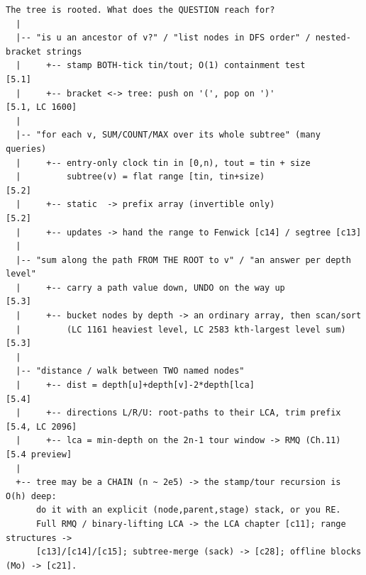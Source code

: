 \begin{lstlisting}[language={}, basicstyle=\ttfamily\small, numbers=none, frame=single]
  The tree is rooted. What does the QUESTION reach for?
  |
  |-- "is u an ancestor of v?" / "list nodes in DFS order" / nested-bracket strings
  |     +-- stamp BOTH-tick tin/tout; O(1) containment test            [5.1]
  |     +-- bracket <-> tree: push on '(', pop on ')'                  [5.1, LC 1600]
  |
  |-- "for each v, SUM/COUNT/MAX over its whole subtree" (many queries)
  |     +-- entry-only clock tin in [0,n), tout = tin + size
  |         subtree(v) = flat range [tin, tin+size)                    [5.2]
  |     +-- static  -> prefix array (invertible only)                  [5.2]
  |     +-- updates -> hand the range to Fenwick [c14] / segtree [c13]
  |
  |-- "sum along the path FROM THE ROOT to v" / "an answer per depth level"
  |     +-- carry a path value down, UNDO on the way up                [5.3]
  |     +-- bucket nodes by depth -> an ordinary array, then scan/sort
  |         (LC 1161 heaviest level, LC 2583 kth-largest level sum)    [5.3]
  |
  |-- "distance / walk between TWO named nodes"
  |     +-- dist = depth[u]+depth[v]-2*depth[lca]                      [5.4]
  |     +-- directions L/R/U: root-paths to their LCA, trim prefix     [5.4, LC 2096]
  |     +-- lca = min-depth on the 2n-1 tour window -> RMQ (Ch.11)     [5.4 preview]
  |
  +-- tree may be a CHAIN (n ~ 2e5) -> the stamp/tour recursion is O(h) deep:
      do it with an explicit (node,parent,stage) stack, or you RE.
      Full RMQ / binary-lifting LCA -> the LCA chapter [c11]; range structures ->
      [c13]/[c14]/[c15]; subtree-merge (sack) -> [c28]; offline blocks (Mo) -> [c21].
\end{lstlisting}



